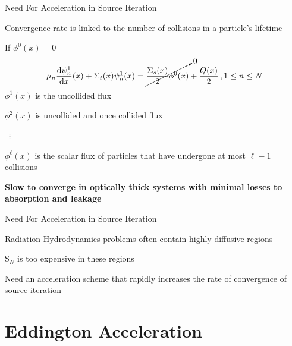 \documentclass[10pt,draft]{beamer}
\newcommand{\SN}{S$_N$\xspace}
\newcommand{\ud}{\mathop{}\!\mathrm{d}} %
\newcommand{\dderiv}[2]{\frac{\ud #1}{\ud #2}}
\begin{document}
\begin{frame}{Need For Acceleration in Source Iteration}

	Convergence rate is linked to the number of collisions in a particle's lifetime

	If $\phi^0(x) = 0$
	\begin{equation*}
		\mu_n \dderiv{\psi_n^{1}}{x}(x) + \Sigma_t(x) \psi_n^{1}(x) =
		\vphantom{\cancelto{0}{\frac{\Sigma_s(x)}{2} \phi^{0}(x)}} 
		\cancelto{0}{\frac{\Sigma_s(x)}{2} \phi^{0}(x)}
		 + \frac{Q(x)}{2} \,, 1 \leq n \leq N 
	\end{equation*}
	\onslide<3->
	$\phi^1(x) $ is the uncollided flux 

	$\phi^2(x)$ is uncollided and once collided flux 

	\ $\vdots$

	$\phi^{\ell}(x)$ is the scalar flux of particles that have undergone at most $\ell - 1$ collisions 

	\textbf{Slow to converge in optically thick systems with minimal losses to absorption and leakage}

\end{frame}

\begin{frame}{Need For Acceleration in Source Iteration}

	Radiation Hydrodynamics problems often contain highly diffusive regions 

	\SN is too expensive in these regions 

	Need an \alert{acceleration scheme} that rapidly increases the rate of convergence of source iteration 

\end{frame}

\section{Eddington Acceleration}
\end{document}
